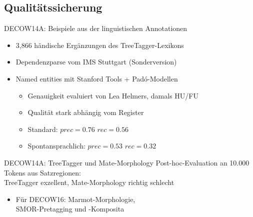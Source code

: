 \subsection{Qualitätssicherung}

\begin{frame}
  {DECOW14A: Beispiele aus der linguistischen Annotationen}
  \begin{itemize}
    \item 3,866 händische Ergänzungen des TreeTagger-Lexikons
    \item Dependenzparse vom IMS Stuttgart (Sonderversion)

	\vspace{0.5cm}

    \item Named entities mit Stanford Tools + Padó-Modellen

    \begin{itemize}
		\item Genauigkeit evaluiert von Lea Helmers, damals HU\slash FU
		\item Qualität stark abhängig vom Register
		\item Standard: $prec=0.76$ $rec=0.56$
		\item Spontansprachlich: $prec=0.53$ $rec=0.32$
      \end{itemize}
  \end{itemize}
\end{frame}



\begin{frame}
  {DECOW14A: TreeTagger und Mate-Morphology}
  Post-hoc-Evaluation an 10.000 Tokens aus Satzregionen:\\
  TreeTagger exzellent, Mate-Morphology richtig schlecht
  \vspace{0.5cm}
  \begin{center}
  \end{center}

	\begin{itemize}
	  \item Für DECOW16: Marmot-Morphologie,\\SMOR-Pretagging und -Komposita
	\end{itemize}
 
\end{frame}


